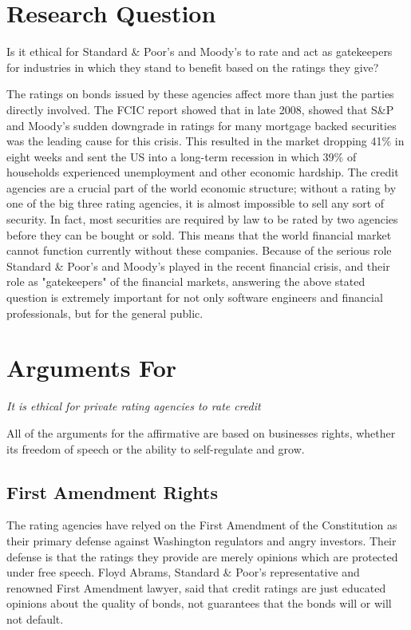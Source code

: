 \documentclass[11pt]{article}
\begin{document}
\begin{multicols}{2}

\section{Research Question}
Is it ethical for Standard \& Poor's and Moody's to rate and act as gatekeepers for industries in which they stand to benefit based on the ratings they give?

The ratings on bonds issued by these agencies affect more than just the parties directly involved. The FCIC report showed that in late 2008, showed that S\&P and Moody's sudden downgrade in ratings for many mortgage backed securities was the leading cause for this crisis. \cite{huffCreditCause}  This resulted in the market dropping 41\% in eight weeks \cite{marketWatch} and sent the US into a long-term recession in which 39\% of households experienced unemployment and other economic hardship. \cite{collapseImpact}  The credit agencies are a crucial part of the world economic structure; without a rating by one of the big three rating agencies, it is almost impossible to sell any sort of security.  In fact, most securities are required by law to be rated by two agencies before they can be bought or sold. \cite{wpMoodies}  This means that the world financial market cannot function currently without these companies.  Because of the serious role Standard \& Poor's and Moody's played in the recent financial crisis, and their role as "gatekeepers" of the financial markets, answering the above stated question is extremely important for not only software engineers and financial professionals, but for the general public.    


\section{Arguments For}
\textit{It is ethical for private rating agencies to rate credit}

All of the arguments for the affirmative are based on businesses rights, whether its freedom of speech or the ability to self-regulate and grow.
\subsection{First Amendment Rights}
The rating agencies have relyed on the First Amendment of the Constitution as their primary defense against Washington regulators and angry investors. Their defense is that the ratings they provide are merely opinions which are protected under free speech.  Floyd Abrams, Standard \& Poor's representative and renowned First Amendment lawyer, said that credit ratings are just educated opinions about the quality of bonds, not guarantees that the bonds will or will not default. 

\end{multicols}
\end{document}
